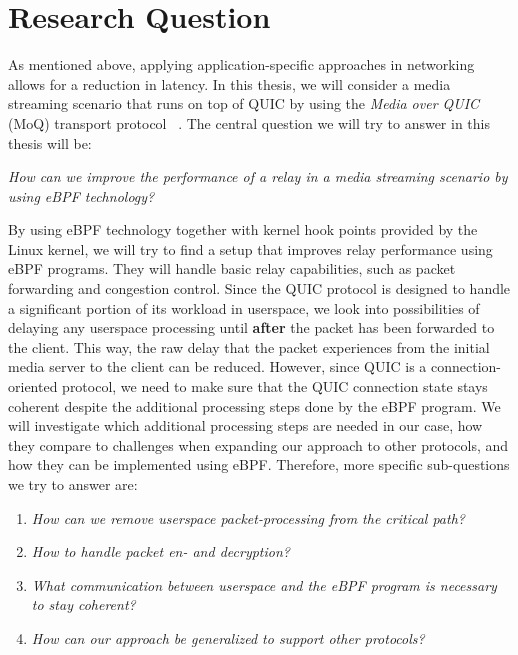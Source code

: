 \section{Research Question}\label{sec:research_question}

As mentioned above, applying application-specific approaches in networking allows for a reduction in latency.
In this thesis, we will consider a media streaming scenario that runs on top of QUIC by using the \textit{Media over QUIC} (MoQ) transport protocol
~\parencite{draft-moqtransport}.
The central question we will try to answer in this thesis will be:
\vspace{0.5cm}
\begin{center}
    \textit{How can we improve the performance of a relay in a media streaming scenario by using eBPF technology?}
\end{center}
\vspace{0.5cm}
By using eBPF technology together with kernel hook points provided by the Linux kernel, we will try to find a setup that improves relay 
performance using eBPF programs.
They will handle basic relay capabilities, such as packet forwarding and congestion control.
Since the QUIC protocol is designed to handle a significant portion of its workload in userspace, we look into possibilities of delaying any 
userspace processing until \textbf{after} the packet has been forwarded to the client.
This way, the raw delay that the packet experiences from the initial media server to the client can be reduced. 
However, since QUIC is a connection-oriented protocol, we need to make sure that the QUIC connection state stays 
coherent despite the additional processing steps done by the eBPF program.
We will investigate which additional processing steps are needed in our case, how they compare to challenges when expanding our approach to other protocols, 
and how they can be implemented using eBPF\@.
Therefore, more specific sub-questions we try to answer are:
\vspace{0.5cm}
\begin{enumerate}
    \item \textit{How can we remove userspace packet-processing from the critical path?}
    \item \textit{How to handle packet en- and decryption?}
    \item \textit{What communication between userspace and the eBPF program is necessary to stay coherent?}
    \item \textit{How can our approach be generalized to support other protocols?}
\end{enumerate}
\vspace{0.5cm}